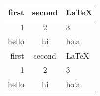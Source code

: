 \documentclass[a4paper]{article}
\begin{document}
	\begin{tabular}{|r|cl|}
		\hline
		first & second & \LaTeX\\
		\hline
		1 & 2 & 3\\
		\cline{2-3}
		hello & hi & hola\\
		\hline
		\hline
		first & second & \LaTeX\\
		\hline
		1 & 2 & 3\\
		\cline{2-3}
		hello & hi & hola\\
		\hline
	\end{tabular}
\end{document}
